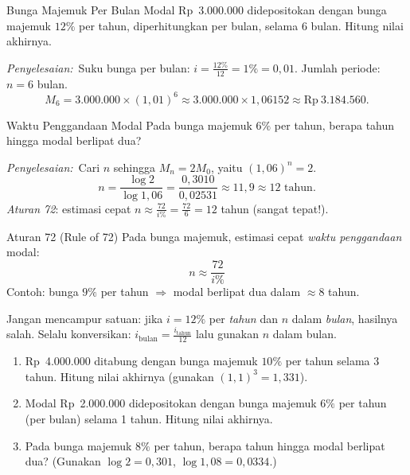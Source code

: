 \documentclass[11pt,a4paper]{report}
\theoremstyle{gaya}
\newcommand{\jawab}{\par\smallskip\noindent\textit{\textcolor{oranye}{Penyelesaian:}}\ }
\begin{document}
\begin{contoh}{Bunga Majemuk Per Bulan}
Modal Rp~3.000.000 didepositokan dengan bunga majemuk $12\%$ per tahun, diperhitungkan per bulan, selama 6 bulan. Hitung nilai akhirnya.

\jawab Suku bunga per bulan: $i = \frac{12\%}{12} = 1\% = 0{,}01$. Jumlah periode: $n = 6$ bulan.
\[
  M_6 = 3.000.000 \times (1{,}01)^6 \approx 3.000.000 \times 1{,}06152 \approx \text{Rp}\ 3.184.560.
\]
\end{contoh}

\begin{contoh}{Waktu Penggandaan Modal}
Pada bunga majemuk $6\%$ per tahun, berapa tahun hingga modal berlipat dua?

\jawab Cari $n$ sehingga $M_n = 2M_0$, yaitu $(1{,}06)^n = 2$.
\[
  n = \frac{\log 2}{\log 1{,}06} = \frac{0{,}3010}{0{,}02531} \approx 11{,}9 \approx 12 \text{ tahun}.
\]
\textit{Aturan 72}: estimasi cepat $n \approx \frac{72}{i\%} = \frac{72}{6} = 12$ tahun (sangat tepat!).
\end{contoh}

\begin{konsep}{Aturan 72 (Rule of 72)}
Pada bunga majemuk, estimasi cepat \emph{waktu penggandaan} modal:
\[
  n \approx \frac{72}{i\%}
\]
Contoh: bunga $9\%$ per tahun $\Rightarrow$ modal berlipat dua dalam $\approx 8$ tahun.
\end{konsep}

\begin{kesalahan}
Jangan mencampur satuan: jika $i = 12\%$ per \emph{tahun} dan $n$ dalam \emph{bulan}, hasilnya salah. Selalu konversikan: $i_{\text{bulan}} = \frac{i_{\text{tahun}}}{12}$ lalu gunakan $n$ dalam bulan.
\end{kesalahan}

\begin{latihan}
\begin{enumerate}[leftmargin=*,topsep=2pt]
  \item Rp~4.000.000 ditabung dengan bunga majemuk $10\%$ per tahun selama 3 tahun. Hitung nilai akhirnya (gunakan $(1{,}1)^3 = 1{,}331$).
  \item Modal Rp~2.000.000 didepositokan dengan bunga majemuk $6\%$ per tahun (per bulan) selama 1 tahun. Hitung nilai akhirnya.
  \item Pada bunga majemuk $8\%$ per tahun, berapa tahun hingga modal berlipat dua? (Gunakan $\log 2 = 0{,}301$, $\log 1{,}08 = 0{,}0334$.)
\end{enumerate}
\end{latihan}
\end{document}
